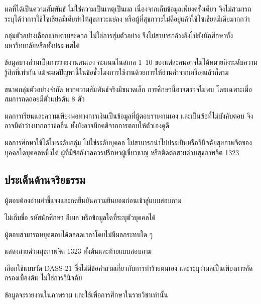 \begin{subsubitems}
    \item ผลที่ได้เป็นความสัมพันธ์ ไม่ใช่ความเป็นเหตุเป็นผล เนื่องจากเก็บข้อมูลเพียงครั้งเดียว จึงไม่สามารถระบุได้ว่าการใช้โซเชียลมีเดียทำให้สุขภาวะแย่ลง หรือผู้ที่สุขภาวะไม่ดีอยู่แล้วใช้โซเชียลมีเดียมากกว่า
    \item กลุ่มตัวอย่างเลือกแบบตามสะดวก ไม่ใช่การสุ่มตัวอย่าง จึงไม่สามารถอ้างอิงไปยังนักศึกษาทั้งมหาวิทยาลัยหรือทั้งประเทศได้
    \item ข้อมูลบางส่วนเป็นการรายงานตนเอง คะแนนในสเกล 1--10 ของแต่ละคนอาจไม่ได้หมายถึงระดับความรู้สึกที่เท่ากัน แม้จะลดปัญหานี้ในข้อชั่วโมงการใช้งานด้วยการให้อ่านค่าจากเครื่องแล้วก็ตาม
    \item ขนาดกลุ่มตัวอย่างจำกัด หากความสัมพันธ์จริงมีขนาดเล็ก การศึกษานี้อาจตรวจไม่พบ โดยเฉพาะเมื่อสมการถดถอยมีตัวแปรต้น 8 ตัว
    \item ผลการเรียนและความเพียงพอทางการเงินเป็นข้อมูลที่ผู้ตอบรายงานเอง และเป็นข้อที่ไม่บังคับตอบ จึงอาจมีค่าว่างมากกว่าข้ออื่น ทั้งยังอาจมีอคติจากการตอบให้ตัวเองดูดี
    \item ผลการศึกษาใช้ได้ในระดับกลุ่ม ไม่ใช่ระดับบุคคล ไม่สามารถนำไปประเมินหรือวินิจฉัยสุขภาพจิตของบุคคลใดบุคคลหนึ่งได้ ผู้ที่มีข้อกังวลควรปรึกษาผู้เชี่ยวชาญ หรือติดต่อสายด่วนสุขภาพจิต 1323
\end{subsubitems}

\subsection{ประเด็นด้านจริยธรรม}

\begin{subsubitems}
    \item ผู้ตอบต้องอ่านคำชี้แจงและกดยืนยันความยินยอมก่อนเข้าสู่แบบสอบถาม
    \item ไม่เก็บชื่อ รหัสนักศึกษา อีเมล หรือข้อมูลใดที่ระบุตัวบุคคลได้
    \item ผู้ตอบสามารถหยุดตอบได้ตลอดเวลาโดยไม่มีผลกระทบใด ๆ
    \item แสดงสายด่วนสุขภาพจิต 1323 ทั้งต้นและท้ายแบบสอบถาม
    \item เลือกใช้แบบวัด DASS-21 ซึ่งไม่มีข้อคำถามเกี่ยวกับการทำร้ายตนเอง และระบุว่าผลเป็นเพียงการคัดกรองเบื้องต้น ไม่ใช่การวินิจฉัย
    \item ข้อมูลจะรายงานในภาพรวม และใช้เพื่อการศึกษาในรายวิชาเท่านั้น
\end{subsubitems}
